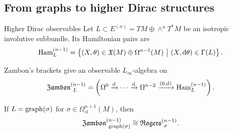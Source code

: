 \documentclass[beamer,10pt]{standalone}
\begin{document}
\subsection{From graphs to higher Dirac structures}

\begin{frame}{Higher Dirac observables}
  Let $L\subset E^{(n)}=TM\oplus\wedge^nT^*M$ be an isotropic involutive
  subbundle. Its Hamiltonian pairs are
  \[
    \Ham_L^{(n-1)}=
    \left\{(X,\theta)\in\X(M)\oplus\Omega^{n-1}(M)
      \ \middle|\ (X,\d\theta)\in\Gamma(L)\right\}.
  \]

  \vfill\pause
  Zambon's brackets give an observable $L_\infty$-algebra on
  \[
    \Zambon[L]{n-1}=
    \left(
      \Omega^0\xrightarrow{\d}\cdots\xrightarrow{\d}
      \Omega^{n-2}\xrightarrow{(0,\d)}\Ham_L^{(n-1)}
    \right).
  \]

  \vfill\pause
  \begin{exblock}
    If $L=\graph(\sigma)$ for
    $\sigma\in\Omega^{n+1}_{\mathrm{cl}}(M)$, then
    \[
      \Zambon[\graph(\sigma)]{n-1}\cong\Rogers[\sigma]{n-1}.
    \]
  \end{exblock}
\end{frame}
\end{document}
